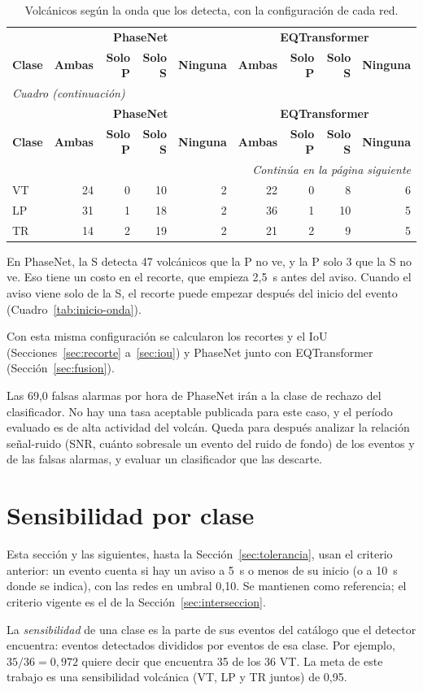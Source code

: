 \documentclass[11pt,a4paper,oneside,spanish,oldfontcommands]{memoir}
\newcommand{\cabecera}[2]{%
  \toprule #1 \\ \midrule \endfirsthead
  \multicolumn{#2}{l}{\itshape Cuadro \thetable{} (continuación)}\\
  \toprule #1 \\ \midrule \endhead
  \midrule \multicolumn{#2}{r}{\itshape Continúa en la página siguiente}\\ \endfoot
  \bottomrule \endlastfoot}
\begin{document}
{\small
\setlength{\tabcolsep}{5pt}
\begin{longtable}{lrrrrrrrr}
\caption{Volcánicos según la onda que los detecta, con la configuración de cada red.}\label{tab:onda-config}\\
\cabecera{ & \multicolumn{4}{c}{\textbf{PhaseNet}} & \multicolumn{4}{c}{\textbf{EQTransformer}} \\ \textbf{Clase} & \textbf{Ambas} & \textbf{Solo P} & \textbf{Solo S} & \textbf{Ninguna} & \textbf{Ambas} & \textbf{Solo P} & \textbf{Solo S} & \textbf{Ninguna}}{9}
VT & 24 & 0 & 10 & 2 & 22 & 0 & 8 & 6 \\
LP & 31 & 1 & 18 & 2 & 36 & 1 & 10 & 5 \\
TR & 14 & 2 & 19 & 2 & 21 & 2 & 9 & 5 \\
\end{longtable}
}

En PhaseNet, la S detecta 47 volcánicos que la P no ve, y la P solo 3 que la S
no ve. Eso tiene un costo en el recorte, que empieza 2,5~s antes del aviso. Cuando el aviso viene solo de la S, el recorte puede empezar después del inicio
del evento (Cuadro~\ref{tab:inicio-onda}).

Con esta misma configuración se calcularon los recortes y el IoU
(Secciones~\ref{sec:recorte} a~\ref{sec:iou}) y PhaseNet junto con
EQTransformer (Sección~\ref{sec:fusion}).

Las 69,0 falsas alarmas por hora de PhaseNet irán a la clase de rechazo del
clasificador. No hay una tasa aceptable publicada para este caso, y el período
evaluado es de alta actividad del volcán. Queda para después analizar la
relación señal-ruido (SNR, cuánto sobresale un evento del ruido de fondo) de los
eventos y de las falsas alarmas, y evaluar un clasificador que las descarte.

\section{Sensibilidad por clase}\label{sec:sensibilidad}

Esta sección y las siguientes, hasta la Sección~\ref{sec:tolerancia}, usan el
criterio anterior: un evento cuenta si hay un aviso a 5~s o menos de su inicio
(o a 10~s donde se indica), con las redes en umbral 0,10. Se mantienen como
referencia; el criterio vigente es el de la Sección~\ref{sec:interseccion}.

La \emph{sensibilidad} de una clase es la parte de sus eventos del catálogo que
el detector encuentra: eventos detectados divididos por eventos de esa clase.
Por ejemplo, $35/36 = 0{,}972$ quiere decir que encuentra 35 de los 36 VT. La
meta de este trabajo es una sensibilidad volcánica (VT, LP y TR juntos) de 0,95.
\end{document}
